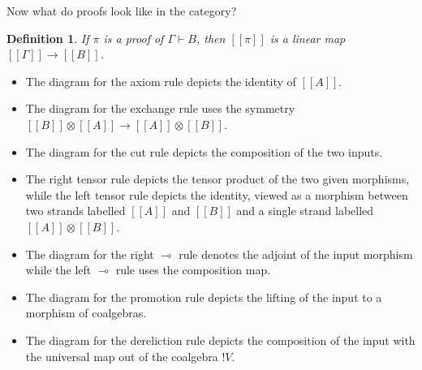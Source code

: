 \documentclass[12pt,a4paper]{article}
\newtheorem{definition}[theorem]{Definition}
\begin{document}
Now what do proofs look like in the category?

\begin{definition}
    If $\pi$ is a proof of $\Gamma\vdash B$, then $[[\pi]]$ is a linear map $[[\Gamma]]\to[[B]]$.
\end{definition}

\begin{itemize}
\item The diagram for the axiom rule depicts the identity of $[[A]]$.
\item The diagram for the exchange rule uses the symmetry $[[B]] \otimes [[A]] \to [[A]] \otimes [[B]]$.
\item The diagram for the cut rule depicts the composition of the two inputs.
\item The right tensor rule depicts the tensor product of the two given morphisms, while the left tensor rule depicts the identity, viewed as a morphism between two strands labelled $[[A]]$ and $[[B]]$ and a single strand labelled $[[A]] \otimes [[B]]$.
\item The diagram for the right $\multimap$ rule denotes the adjoint of the input morphism while the left $\multimap$ rule uses the composition map.
\item The diagram for the promotion rule depicts the lifting of the input to a morphism of coalgebras.
\item The diagram for the dereliction rule depicts the composition of the input with the universal map out of the coalgebra ${!} V$.
\end{itemize}
\end{document}
